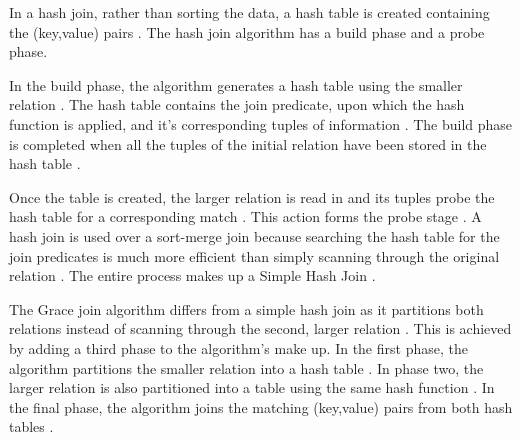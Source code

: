 \documentclass[10pt,twocolumn]{witseiepaper}
\begin{document}
In a hash join, rather than sorting the data, a hash table is created containing the (key,value) pairs \cite{thomas_zurek_optimisation_1997}. The hash join algorithm has a build phase and a probe phase\cite{equijoin}. 

In the build phase, the algorithm generates a hash table using the smaller relation \cite{evaluating4JoinAlgorithms}. The hash table contains the join predicate, upon which the hash function is applied, and it's corresponding tuples of information \cite{thomas_zurek_optimisation_1997, evaluating4JoinAlgorithms}. The build phase is completed when all the tuples of the initial relation have been stored in the hash table \cite{thomas_zurek_optimisation_1997}. 

Once the table is created, the larger relation is read in and its tuples probe the hash table for a corresponding match \cite{thomas_zurek_optimisation_1997}. This action forms the probe stage \cite{evaluating4JoinAlgorithms}. A hash join is used over a sort-merge join because searching the hash table for the join predicates is much more efficient than simply scanning through the original relation \cite{evaluating4JoinAlgorithms}. The entire process makes up a Simple Hash Join \cite{evaluating4JoinAlgorithms}. 

The Grace join algorithm differs from a simple hash join as it partitions both relations instead of scanning through the second, larger relation \cite{graceHash}. This is achieved by adding a third phase to the algorithm's make up. In the first phase, the algorithm partitions the smaller relation into a hash table \cite{graceHash}. In phase two, the larger relation is also partitioned into a table using the same hash function \cite{evaluating4JoinAlgorithms}. In the final phase, the algorithm joins the matching (key,value) pairs from both hash tables \cite{evaluating4JoinAlgorithms}.
\end{document}
